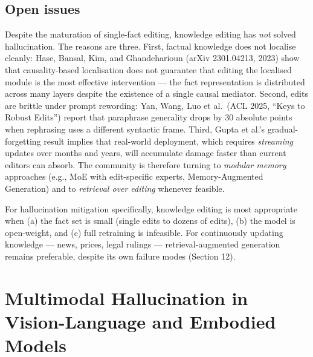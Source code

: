 \subsection{Open issues}\label{open-issues}

Despite the maturation of single-fact editing, knowledge editing has \emph{not} solved hallucination. The reasons are three. First, factual knowledge does not localise cleanly: Hase, Bansal, Kim, and Ghandeharioun (arXiv 2301.04213, 2023) show that causality-based localisation does not guarantee that editing the localised module is the most effective intervention --- the fact representation is distributed across many layers despite the existence of a single causal mediator. Second, edits are brittle under prompt rewording: Yan, Wang, Luo et al.~(ACL 2025, ``Keys to Robust Edits'') report that paraphrase generality drops by 30 absolute points when rephrasing uses a different syntactic frame. Third, Gupta et al.'s gradual-forgetting result implies that real-world deployment, which requires \emph{streaming} updates over months and years, will accumulate damage faster than current editors can absorb. The community is therefore turning to \emph{modular memory} approaches (e.g., MoE with edit-specific experts, Memory-Augmented Generation) and to \emph{retrieval over editing} whenever feasible.

For hallucination mitigation specifically, knowledge editing is most appropriate when (a) the fact set is small (single edits to dozens of edits), (b) the model is open-weight, and (c) full retraining is infeasible. For continuously updating knowledge --- news, prices, legal rulings --- retrieval-augmented generation remains preferable, despite its own failure modes (Section 12).

\section{Multimodal Hallucination in Vision-Language and Embodied Models}\label{multimodal-hallucination-in-vision-language-and-embodied-models}


